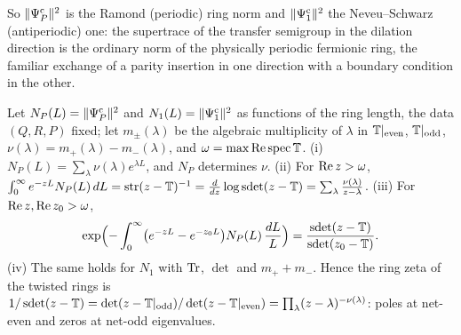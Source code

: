 So $\|\Psi^{\mathrm c}_{P}\|^2$ is the Ramond (periodic) ring norm and $\|\Psi^{\mathrm c}_{1}\|^2$ the
Neveu--Schwarz (antiperiodic) one: the supertrace of the transfer semigroup in the dilation
direction is the ordinary norm of the physically periodic fermionic ring, the familiar
exchange of a parity insertion in one direction with a boundary condition in the other.

\begin{theorem}
\label{thm:cmps-sdet}
Let $N_P(L)=\|\Psi^{\mathrm c}_{P}\|^2$ and $N_1(L)=\|\Psi^{\mathrm c}_{1}\|^2$ as functions of the ring length, the
data $(Q,R,P)$ fixed; let $m_\pm(\lambda)$ be the algebraic multiplicity of $\lambda$ in
$\mathbb T|_{\mathrm{even}}$, $\mathbb T|_{\mathrm{odd}}$, $\nu(\lambda)=m_+(\lambda)-m_-(\lambda)$, and
$\omega=\max\operatorname{Re}\operatorname{spec}\mathbb T$. (i) $N_P(L)=\sum_\lambda\nu(\lambda)e^{\lambda L}$, and
$N_P$ determines $\nu$. (ii) For $\operatorname{Re} z>\omega$,
$\int_0^\infty e^{-zL}N_P(L)\,dL=\operatorname{str}(z-\mathbb T)^{-1}=\frac{d}{dz}\log\operatorname{sdet}(z-\mathbb T)=\sum_\lambda
\frac{\nu(\lambda)}{z-\lambda}$. (iii) For $\operatorname{Re} z,\operatorname{Re} z_0>\omega$,
\[
  \exp\Bigl(-\int_0^\infty\bigl(e^{-zL}-e^{-z_0L}\bigr)N_P(L)\,\frac{dL}{L}\Bigr)
  =\frac{\operatorname{sdet}(z-\mathbb T)}{\operatorname{sdet}(z_0-\mathbb T)} .
\]
(iv) The same holds for $N_1$ with $\operatorname{Tr}$, $\det$ and $m_++m_-$. Hence the ring zeta of the
twisted rings is $1/\operatorname{sdet}(z-\mathbb T)=\det(z-\mathbb T|_{\mathrm{odd}})/\det(z-\mathbb T|_{\mathrm{even}})
=\prod_\lambda(z-\lambda)^{-\nu(\lambda)}$: poles at net-even and zeros at net-odd eigenvalues.
\end{theorem}

